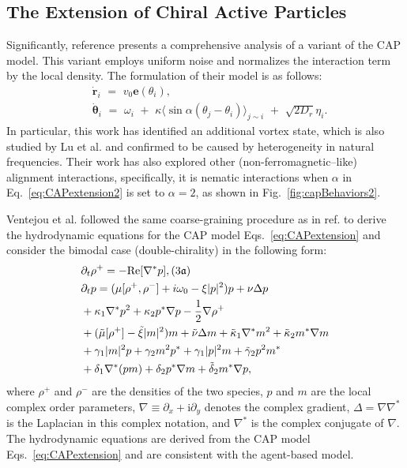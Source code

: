 \documentclass[a4paper, amsfonts, amssymb, amsmath, reprint, showkeys, showpacs, nofootinbib, twoside]{revtex4-2}
\begin{document}
\subsection{The Extension of Chiral Active Particles}
Significantly, reference \cite{PhysRevLett.127.238001} presents a comprehensive analysis of a variant of the CAP model. This variant employs uniform noise and normalizes the interaction term by the local density. The formulation of their model is as follows:
\begin{subequations}
    \label{eq:CAPextension}
    \begin{align}
        &\dot{\mathbf{r}}_i\,\,=\,\,v_0\mathbf{e}(\theta _i),\\
        &\dot{\mathbf{\theta}}_i\,\,=\,\,\omega _i\,\,+\,\,\kappa \langle \sin \alpha (\theta _j-\theta _i)\rangle _{j\sim i}\,\,+\,\,\sqrt{2D_r}\eta _i.\label{eq:CAPextension2}
    \end{align}
\end{subequations}
In particular, this work has identified an additional vortex state, which is also studied by Lu et al. \cite{LU2025115794} and confirmed to be caused by heterogeneity in natural frequencies.
Their work has also explored other (non-ferromagnetic–like) alignment interactions, specifically, it is nematic interactions when $\alpha$ in Eq.~\eqref{eq:CAPextension2} is set to $\alpha =2$, as shown in Fig.~\ref{fig:capBehaviors2}.

Ventejou et al. \cite{PhysRevLett.127.238001} followed the same coarse-graining procedure as in ref. \cite{PhysRevLett.119.058002} to derive the hydrodynamic equations for the CAP model Eqs.~\eqref{eq:CAPextension} and consider the bimodal case (double-chirality) in the following form:
\begin{subequations}
    \begin{align}
        &\partial _t\rho ^+=-\mathrm{Re}[\nabla ^*p],(3\mathfrak{a} )\\
        &\partial _tp=(\mu [\rho ^+,\rho ^-]+i\omega _0-\xi |p|^2)p+\nu \Delta p\notag\\
        &+\kappa _1\nabla ^*p^2+\kappa _2p^*\nabla p-\frac{1}{2}\nabla \rho ^+\notag\\
        &+(\tilde{\mu}[\rho ^+]-\tilde{\xi}|m|^2)m+\tilde{\nu}\Delta m+\tilde{\kappa}_1\nabla ^*m^2+\tilde{\kappa}_2m^*\nabla m\notag\\
        &+\gamma _1|m|^2p+\gamma _2m^2p^*+\gamma _1|p|^2m+\tilde{\gamma}_2p^2m^*\notag\\
        &+\delta _1\nabla ^*(pm)+\delta _2p^*\nabla m+\tilde{\delta}_2m^*\nabla p,
    \end{align}
\end{subequations}
where $\rho ^+$ and $\rho ^-$ are the densities of the two species, $p$ and $m$ are the local complex order parameters, $\nabla\equiv\partial_x+\mathrm{i}\partial_y$ denotes the complex gradient, $\Delta=\nabla\nabla^{*}$ is the Laplacian in this complex notation, and $\nabla^{*}$ is the complex conjugate of $\nabla$. The hydrodynamic equations are derived from the CAP model Eqs.~\eqref{eq:CAPextension} and are consistent with the agent-based model.
\end{document}
